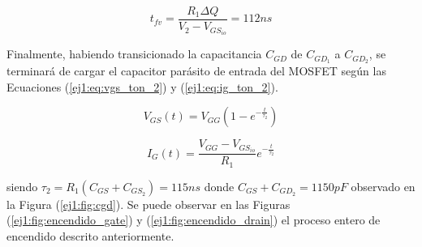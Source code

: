 \begin{equation}
	t_{fv} = \frac{R_1 \Delta Q}{V_2 - V_{GS_{io}}} = 112ns
	\label{ej1:eq:tfv}
\end{equation}

Finalmente, habiendo transicionado la capacitancia $C_{GD}$ de $C_{GD_1}$ a $C_{GD_2}$, se terminará de cargar el capacitor parásito de entrada del MOSFET según las Ecuaciones (\ref{ej1:eq:vgs_ton_2}) y (\ref{ej1:eq:ig_ton_2}).

\begin{equation}
V_{GS}(t) = V_{GG}(1-e^{-\frac{t}{\tau_2}})
\label{ej1:eq:vgs_ton_2}
\end{equation}

\begin{equation}
I_{G}(t) =  \frac{V_{GG}-V_{GS_{io}}}{R_1}e^{-\frac{t}{\tau_2}}
\label{ej1:eq:ig_ton_2}
\end{equation}

siendo $\tau_2 = R_1(C_{GS} + C_{GS_2}) = 115ns$ donde $C_{GS} + C_{GD_2} = 1150pF$ observado en la Figura (\ref{ej1:fig:cgd}). Se puede observar en las Figuras (\ref{ej1:fig:encendido_gate}) y (\ref{ej1:fig:encendido_drain}) el proceso entero de encendido descrito anteriormente.

